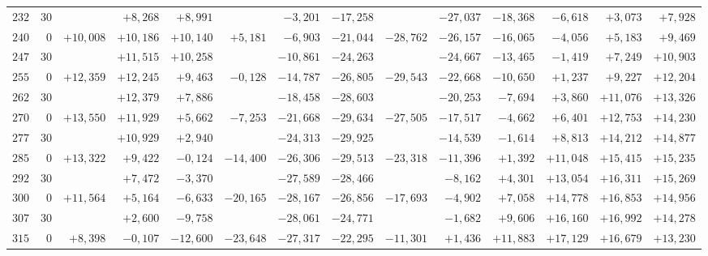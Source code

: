 \begin{landscape}
\begin{longtable}{@{}rr|r|r|r|r|r|r|r|r|r|r|r|r@{}}
\(232\) & \(30\) &  & \(+8{,}268\) & \(+8{,}991\) &  & \(-3{,}201\) & \(-17{,}258\) &  & \(-27{,}037\) & \(-18{,}368\) & \(-6{,}618\) & \(+3{,}073\) & \(+7{,}928\)\\[2pt]
\(240\) & \(0\) & \(+10{,}008\) & \(+10{,}186\) & \(+10{,}140\) & \(+5{,}181\) & \(-6{,}903\) & \(-21{,}044\) & \(-28{,}762\) & \(-26{,}157\) & \(-16{,}065\) & \(-4{,}056\) & \(+5{,}183\) & \(+9{,}469\)\\
\(247\) & \(30\) &  & \(+11{,}515\) & \(+10{,}258\) &  & \(-10{,}861\) & \(-24{,}263\) &  & \(-24{,}667\) & \(-13{,}465\) & \(-1{,}419\) & \(+7{,}249\) & \(+10{,}903\)\\
\(255\) & \(0\) & \(+12{,}359\) & \(+12{,}245\) & \(+9{,}463\) & \(-0{,}128\) & \(-14{,}787\) & \(-26{,}805\) & \(-29{,}543\) & \(-22{,}668\) & \(-10{,}650\) & \(+1{,}237\) & \(+9{,}227\) & \(+12{,}204\)\\
\(262\) & \(30\) &  & \(+12{,}379\) & \(+7{,}886\) &  & \(-18{,}458\) & \(-28{,}603\) &  & \(-20{,}253\) & \(-7{,}694\) & \(+3{,}860\) & \(+11{,}076\) & \(+13{,}326\)\\[2pt]
\(270\) & \(0\) & \(+13{,}550\) & \(+11{,}929\) & \(+5{,}662\) & \(-7{,}253\) & \(-21{,}668\) & \(-29{,}634\) & \(-27{,}505\) & \(-17{,}517\) & \(-4{,}662\) & \(+6{,}401\) & \(+12{,}753\) & \(+14{,}230\)\\
\(277\) & \(30\) &  & \(+10{,}929\) & \(+2{,}940\) &  & \(-24{,}313\) & \(-29{,}925\) &  & \(-14{,}539\) & \(-1{,}614\) & \(+8{,}813\) & \(+14{,}212\) & \(+14{,}877\)\\
\(285\) & \(0\) & \(+13{,}322\) & \(+9{,}422\) & \(-0{,}124\) & \(-14{,}400\) & \(-26{,}306\) & \(-29{,}513\) & \(-23{,}318\) & \(-11{,}396\) & \(+1{,}392\) & \(+11{,}048\) & \(+15{,}415\) & \(+15{,}235\)\\
\(292\) & \(30\) &  & \(+7{,}472\) & \(-3{,}370\) &  & \(-27{,}589\) & \(-28{,}466\) &  & \(-8{,}162\) & \(+4{,}301\) & \(+13{,}054\) & \(+16{,}311\) & \(+15{,}269\)\\[2pt]
\(300\) & \(0\) & \(+11{,}564\) & \(+5{,}164\) & \(-6{,}633\) & \(-20{,}165\) & \(-28{,}167\) & \(-26{,}856\) & \(-17{,}693\) & \(-4{,}902\) & \(+7{,}058\) & \(+14{,}778\) & \(+16{,}853\) & \(+14{,}956\)\\
\(307\) & \(30\) &  & \(+2{,}600\) & \(-9{,}758\) &  & \(-28{,}061\) & \(-24{,}771\) &  & \(-1{,}682\) & \(+9{,}606\) & \(+16{,}160\) & \(+16{,}992\) & \(+14{,}278\)\\
\(315\) & \(0\) & \(+8{,}398\) & \(-0{,}107\) & \(-12{,}600\) & \(-23{,}648\) & \(-27{,}317\) & \(-22{,}295\) & \(-11{,}301\) & \(+1{,}436\) & \(+11{,}883\) & \(+17{,}129\) & \(+16{,}679\) & \(+13{,}230\)\\

\end{longtable}
\end{landscape}
